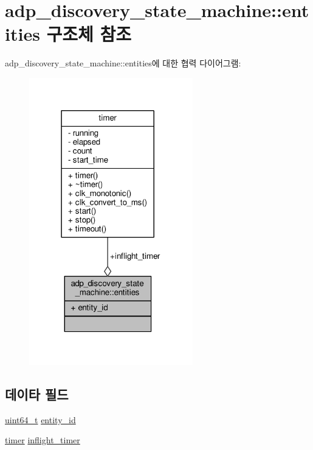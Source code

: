 \hypertarget{structavdecc__lib_1_1adp__discovery__state__machine_1_1entities}{}\section{adp\+\_\+discovery\+\_\+state\+\_\+machine\+:\+:entities 구조체 참조}
\label{structavdecc__lib_1_1adp__discovery__state__machine_1_1entities}


adp\+\_\+discovery\+\_\+state\+\_\+machine\+:\+:entities에 대한 협력 다이어그램\+:
\nopagebreak
\begin{figure}[H]
\begin{center}
\leavevmode
\includegraphics[width=202pt]{structavdecc__lib_1_1adp__discovery__state__machine_1_1entities__coll__graph}
\end{center}
\end{figure}
\subsection*{데이타 필드}
\begin{DoxyCompactItemize}
\item 
\hyperlink{parse_8c_aec6fcb673ff035718c238c8c9d544c47}{uint64\+\_\+t} \hyperlink{structavdecc__lib_1_1adp__discovery__state__machine_1_1entities_af62ee4e75fffd2fbb80f324b5cbcddaa}{entity\+\_\+id}
\item 
\hyperlink{classavdecc__lib_1_1timer}{timer} \hyperlink{structavdecc__lib_1_1adp__discovery__state__machine_1_1entities_a3ed459f3001adecc43378bfede8c3ddb}{inflight\+\_\+timer}
\end{DoxyCompactItemize}



